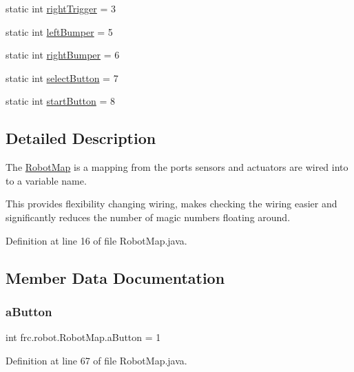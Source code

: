 \begin{DoxyCompactItemize}
\item 
static int \hyperlink{classfrc_1_1robot_1_1RobotMap_a11fdb56e7e48fce0d79ce47500a8fb62}{right\+Trigger} = 3
\item 
static int \hyperlink{classfrc_1_1robot_1_1RobotMap_a5f7843ae11f89f4c181ff983d1124d20}{left\+Bumper} = 5
\item 
static int \hyperlink{classfrc_1_1robot_1_1RobotMap_ad604c407a262f8175b53bc4d4cc21438}{right\+Bumper} = 6
\item 
static int \hyperlink{classfrc_1_1robot_1_1RobotMap_af4fcbac053dc99bf17bfad4073818f58}{select\+Button} = 7
\item 
static int \hyperlink{classfrc_1_1robot_1_1RobotMap_ac74c72dbcfec76ff3773e99109ec8f1f}{start\+Button} = 8
\end{DoxyCompactItemize}


\subsection{Detailed Description}
The \hyperlink{classfrc_1_1robot_1_1RobotMap}{Robot\+Map} is a mapping from the ports sensors and actuators are wired into to a variable name. 

This provides flexibility changing wiring, makes checking the wiring easier and significantly reduces the number of magic numbers floating around. 

Definition at line 16 of file Robot\+Map.\+java.



\subsection{Member Data Documentation}
\mbox{\label{classfrc_1_1robot_1_1RobotMap_add774938fbf6b4cddcd06d376de27513}} 
\subsubsection{\texorpdfstring{a\+Button}{aButton}}
{\footnotesize\ttfamily int frc.\+robot.\+Robot\+Map.\+a\+Button = 1\hspace{0.3cm}{\ttfamily [static]}}



Definition at line 67 of file Robot\+Map.\+java.


